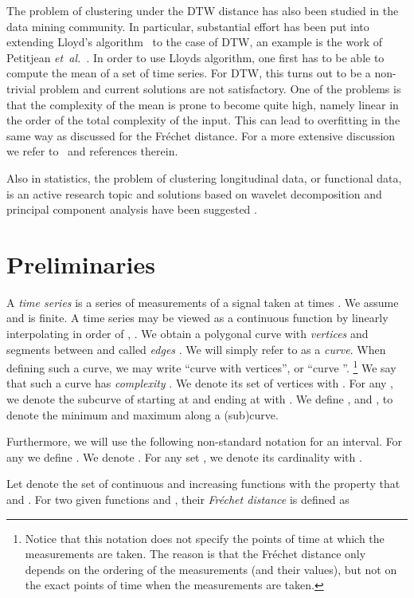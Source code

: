 \documentclass[11pt, letter]{article}
\newcommand{\etal}{\textit{e{}t~a{}l.}\xspace}
\newcommand{\Frechet}{Fr\'echet\xspace}
\begin{document}
The problem of clustering under the DTW distance has also been studied in the data mining community. In particular, substantial effort has been put into extending Lloyd's algorithm~\cite{lloyd82} to the case of DTW, an example is the work of Petitjean \etal~\cite{Petitjean2011678}. In order to use Lloyds algorithm, one first has to be able to compute the mean of a set of time series. For DTW, this turns out to be a non-trivial problem and current solutions are not satisfactory.  One of the problems is that the complexity of the mean is prone to become quite high, namely linear in the order of the total complexity of the input. This can lead to overfitting in the same way as discussed for the \Frechet distance. For a more extensive discussion we refer to~\cite{ar-dcaa-2013} and references therein.

Also in statistics, the problem of clustering longitudinal data, or functional data, is an active research topic and solutions based on wavelet decomposition and principal component analysis have been suggested \cite{cmp-fcis-07, jp-fdc-13, rm-fcbwm-06, wsh-cbc-06}.

\section{Preliminaries}

A \emph{time series} is a series  of measurements
 of a signal taken at times . We assume  and  is finite. A
time series may be viewed as a continuous function  by
linearly interpolating  in order of , . We
obtain a polygonal curve with \emph{vertices}  and segments between  and  called \emph{edges}
. We will simply refer
to  as a \emph{curve}. 
When defining such a curve, we may write ``curve  with 
vertices'', or ``curve ''.
\footnote{Notice that this notation does not specify the points of time at which the measurements
are taken. The reason is that the \Frechet distance only depends on the ordering of
the measurements (and their values), but not on the exact points of time when the measurements
are taken.}
We say that such a curve  has \emph{complexity} . 
We denote its set of vertices with  . For
any , we denote the subcurve of  starting at
 and ending at  with . 
We define 
, and
, 
to denote the minimum and maximum along a (sub)curve.

Furthermore, we will use the following non-standard notation for an interval.
For any  we define . 
We denote . For any
set , we denote its cardinality with .


Let  denote the set of continuous and increasing functions
 with the property that  and . 
For two given functions
 and ,
their \emph{\Frechet distance} is defined as 
\end{document}
